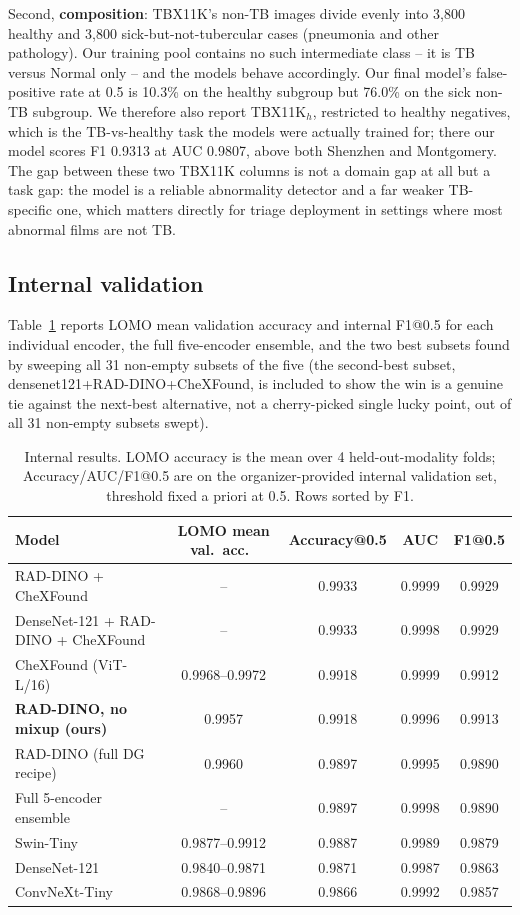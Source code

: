 \documentclass[runningheads]{llncs}
\begin{document}
Second, \textbf{composition}: TBX11K's non-TB images divide evenly into
3{,}800 healthy and 3{,}800 sick-but-not-tubercular cases (pneumonia and
other pathology). Our training pool contains no such intermediate class --
it is TB versus Normal only -- and the models behave accordingly. Our final
model's false-positive rate at 0.5 is 10.3\% on the healthy subgroup but
76.0\% on the sick non-TB subgroup. We therefore also report
TBX11K$_{h}$, restricted to healthy negatives, which is the TB-vs-healthy
task the models were actually trained for; there our model scores F1
0.9313 at AUC 0.9807, above both Shenzhen and Montgomery. The gap between
these two TBX11K columns is not a domain gap at all but a task gap: the
model is a reliable abnormality detector and a far weaker TB-specific one,
which matters directly for triage deployment in settings where most
abnormal films are not TB.

\subsection{Internal validation}

Table~\ref{tab:internal} reports LOMO mean validation accuracy and internal
F1@0.5 for each individual encoder, the full five-encoder ensemble, and the
two best subsets found by sweeping all 31 non-empty subsets of the five
(the second-best subset, densenet121+RAD-DINO+CheXFound, is included to show
the win is a genuine tie against the next-best alternative, not a
cherry-picked single lucky point, out of all 31 non-empty subsets swept).

\begin{table}[t]
\centering
\caption{Internal results. LOMO accuracy is the mean over 4 held-out-modality
folds; Accuracy/AUC/F1@0.5 are on the organizer-provided internal validation
set, threshold fixed a priori at 0.5. Rows sorted by F1.}
\label{tab:internal}
\begin{tabular}{lcccc}
\toprule
Model & LOMO mean val.\ acc.\ & Accuracy@0.5 & AUC & F1@0.5 \\
\midrule
RAD-DINO + CheXFound     & -- & 0.9933 & 0.9999 & 0.9929 \\
DenseNet-121 + RAD-DINO + CheXFound & -- & 0.9933 & 0.9998 & 0.9929 \\
CheXFound (ViT-L/16)     & 0.9968--0.9972 & 0.9918 & 0.9999 & 0.9912 \\
\textbf{RAD-DINO, no mixup (ours)} & 0.9957 & 0.9918 & 0.9996 & 0.9913 \\
RAD-DINO (full DG recipe) & 0.9960         & 0.9897 & 0.9995 & 0.9890 \\
Full 5-encoder ensemble  & --              & 0.9897 & 0.9998 & 0.9890 \\
Swin-Tiny                & 0.9877--0.9912 & 0.9887 & 0.9989 & 0.9879 \\
DenseNet-121            & 0.9840--0.9871 & 0.9871 & 0.9987 & 0.9863 \\
ConvNeXt-Tiny            & 0.9868--0.9896 & 0.9866 & 0.9992 & 0.9857 \\
\bottomrule
\end{tabular}
\end{table}
\end{document}
